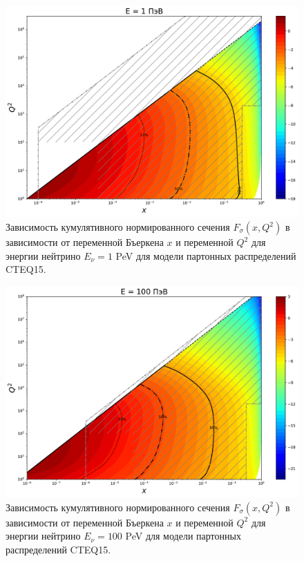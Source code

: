 \begin{figure}[!h]
\centering
\includegraphics[width=0.97\linewidth]{images/NuProp/cdfxq2_cc_proton_CT18ZNNLO_14_1000000.pdf}
\caption{Зависимость кумулятивного нормированного сечения $F_{\sigma}(x,Q^2)$ в зависимости от переменной Бъеркена $x$ и переменной $Q^2$ для энергии нейтрино $E_{\nu} = 1$ PeV для модели партонных распределений CTEQ15\cite{ncteq15}.}
\label{Pp6}
\end{figure}
\begin{figure}[!h]
\centering
\includegraphics[width=0.97\linewidth]{images/NuProp/cdfxq2_cc_proton_CT18ZNNLO_14_100000000.pdf}
\caption{Зависимость кумулятивного нормированного сечения $F_{\sigma}(x,Q^2)$ в зависимости от переменной Бъеркена $x$ и переменной $Q^2$ для энергии нейтрино $E_{\nu} = 100$ PeV для модели партонных распределений CTEQ15\cite{ncteq15}.}
\label{Pp8}
\end{figure}
